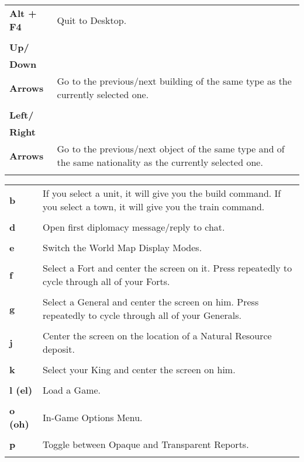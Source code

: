 \begin{tabular}{p{1in} p{3in}}
    \textbf{Alt + F4} & Quit to Desktop.\\ \\
    \textbf{Up/}\\
    \textbf{Down}\\
    \textbf{Arrows} & Go to the previous/next building of the same type as the currently selected one.\\ \\    
    \textbf{Left/}\\
    \textbf{Right}\\
    \textbf{Arrows} & Go to the previous/next object of the same type and of the same nationality as the currently selected one.\\ \\
\end{tabular}    

\begin{tabular}{p{1in} p{3in}}
    \textbf{b} & If you select a unit, it will give you the build command. If you select a town, it will give you the train command.\\ \\
        
        
    \textbf{d} & Open first diplomacy message/reply to chat.\\ \\
    \textbf{e} & Switch the World Map Display Modes.\\ \\
    \textbf{f} & Select a Fort and center the screen on it. Press repeatedly to cycle through all of your Forts. \\ \\

        
    \textbf{g} & Select a General and center the screen on him. Press repeatedly to cycle through all of your Generals.\\ \\    
    \textbf{j} & Center the screen on the location of a Natural Resource deposit.\\ \\    
    \textbf{k} & Select your King and center the screen on him.\\ \\
    \textbf{l (el)} & Load a Game.\\ \\
    \textbf{o (oh)} & In-Game Options Menu.\\ \\    
    \textbf{p} & Toggle between Opaque and Transparent Reports.\\ \\
\end{tabular}

